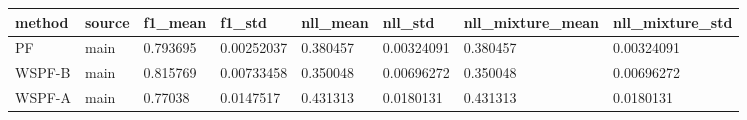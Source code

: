 \begin{tabular}{llllllll}
\hline
method & source & f1\_mean & f1\_std & nll\_mean & nll\_std & nll\_mixture\_mean & nll\_mixture\_std \\
\hline
PF & main & 0.793695 & 0.00252037 & 0.380457 & 0.00324091 & 0.380457 & 0.00324091 \\
WSPF-B & main & 0.815769 & 0.00733458 & 0.350048 & 0.00696272 & 0.350048 & 0.00696272 \\
WSPF-A & main & 0.77038 & 0.0147517 & 0.431313 & 0.0180131 & 0.431313 & 0.0180131 \\
\hline
\end{tabular}
